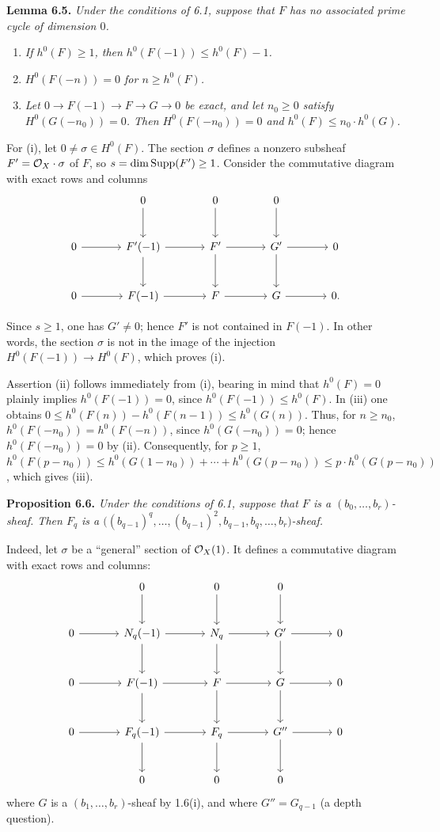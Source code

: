\textbf{Lemma 6.5.} \emph{Under the conditions of 6.1, suppose that $F$
has no associated prime cycle of dimension $0$.}
\begin{enumerate}[label=(\roman*)]
\item \emph{If $h^0(F)\geq1$, then $h^0(F(-1))\leq h^0(F)-1$.}
\item \emph{$H^0(F(-n))=0$ for $n\geq h^0(F)$.}
\item \emph{Let $0\to F(-1)\to F\to G\to0$ be exact, and let
$n_0\geq0$ satisfy $H^0(G(-n_0))=0$. Then $H^0(F(-n_0))=0$ and
$h^0(F)\leq n_0\cdot h^0(G)$.}
\end{enumerate}

For (i), let $0\ne\sigma\in H^0(F)$. The section $\sigma$ defines a nonzero subsheaf $F'=\mathcal O_X\cdot\sigma$ of $F$, so $s=\dim\operatorname{Supp}(F')\geq1$. Consider the commutative diagram with exact rows and columns
\[
\begin{tikzcd}[column sep=large,row sep=large]
&0 \arrow[d]&0 \arrow[d]&0 \arrow[d]&\\
0 \arrow[r]&F'(-1) \arrow[r] \arrow[d]&F' \arrow[r] \arrow[d]&G' \arrow[r] \arrow[d]&0\\
0 \arrow[r]&F(-1) \arrow[r]&F \arrow[r]&G \arrow[r]&0.
\end{tikzcd}
\]

Since $s\geq1$, one has $G'\ne0$; hence $F'$ is not contained in $F(-1)$. In other words, the section $\sigma$ is not in the image of the injection $H^0(F(-1))\to H^0(F)$, which proves (i).

Assertion (ii) follows immediately from (i), bearing in mind that
$h^0(F)=0$ plainly implies $h^0(F(-1))=0$, since
$h^0(F(-1))\leq h^0(F)$. In (iii) one obtains
$0\leq h^0(F(n))-h^0(F(n-1))\leq h^0(G(n))$.
Thus, for $n\geq n_0$, $h^0(F(-n_0))=h^0(F(-n))$, since $h^0(G(-n_0))=0$; hence $h^0(F(-n_0))=0$ by (ii). Consequently, for $p\geq1$,
$h^0(F(p-n_0))
\leq h^0(G(1-n_0))+\cdots+h^0(G(p-n_0))
\leq p\cdot h^0(G(p-n_0))$,
which gives (iii).

\textbf{Proposition 6.6.} \emph{Under the conditions of 6.1, suppose
that $F$ is a $(b_0,\ldots,b_r)$-sheaf. Then $F_q$ is a
$\bigl((b_{q-1})^q,\ldots,(b_{q-1})^2,b_{q-1},b_q,\ldots,b_r\bigr)$-sheaf.}

Indeed, let $\sigma$ be a ``general'' section of $\mathcal O_X(1)$. It defines a commutative diagram with exact rows and columns:
\[
\begin{tikzcd}[column sep=large,row sep=large]
&0 \arrow[d]&0 \arrow[d]&0 \arrow[d]&\\
0 \arrow[r]&N_q(-1) \arrow[r] \arrow[d]&N_q \arrow[r] \arrow[d]&G' \arrow[r] \arrow[d]&0\\
0 \arrow[r]&F(-1) \arrow[r] \arrow[d]&F \arrow[r] \arrow[d]&G \arrow[r] \arrow[d]&0\\
0 \arrow[r]&F_q(-1) \arrow[r] \arrow[d]&F_q \arrow[r] \arrow[d]&G'' \arrow[r] \arrow[d]&0\\
&0&0&0&
\end{tikzcd}
\]
where $G$ is a $(b_1,\ldots,b_r)$-sheaf by 1.6(i), and where
$G''=G_{q-1}$ (a depth question).

